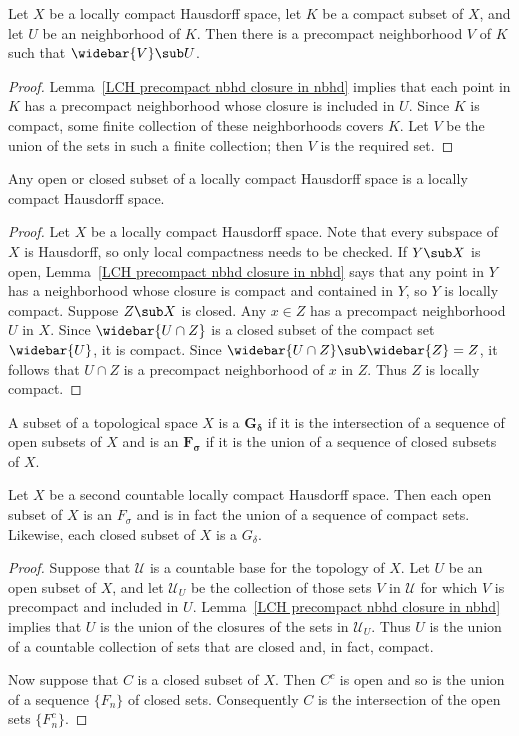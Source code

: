 \begin{proposition}\label{LCH precompact nbhd for compact set}
Let $X$ be a locally compact Hausdorff space, let $K$ be a compact subset of $X$, and let $U$ be an neighborhood of $K$. Then there is a precompact neighborhood $V$ of $K$ such that $\widebar{V}\sub U$.
\end{proposition}
\begin{proof}
Lemma~\ref{LCH precompact nbhd closure in nbhd} implies that each point in $K$ has a precompact neighborhood whose closure is included in $U$. Since $K$ is compact, some finite collection of these neighborhoods covers $K$. Let $V$ be the union of the sets in such a finite collection; then $V$ is the required set.
\end{proof}
\begin{proposition}
Any open or closed subset of a locally compact Hausdorff space is a locally compact Hausdorff space.
\end{proposition}
\begin{proof}
Let $X$ be a locally compact Hausdorff space. Note that every subspace of $X$ is Hausdorff, so only local compactness needs to be checked. If $Y\sub X$ is open, Lemma~\ref{LCH precompact nbhd closure in nbhd} says that any point in $Y$ has a neighborhood whose closure is compact and contained in $Y$, so $Y$ is locally compact. Suppose $Z\sub X$ is closed. Any $x\in Z$ has a precompact neighborhood $U$ in $X$. Since $\widebar{U\cap Z}$ is a closed subset of the compact set $\widebar{U}$, it is compact. Since $\widebar{U\cap Z}\sub\widebar{Z}=Z$, it follows that $U\cap Z$ is a precompact neighborhood of $x$ in $Z$. Thus $Z$ is locally compact.
\end{proof}
A subset of a topological space $X$ is a $\bm{G_{\delta}}$ if it is the intersection of a sequence of open subsets of $X$ and is an $\bm{F_{\sigma}}$ if it is the union of a sequence of closed subsets of $X$.
\begin{proposition}\label{LCH second countable space G_delta}
Let $X$ be a second countable locally compact Hausdorff space. Then each open subset of $X$ is an $F_\sigma$ and is in fact the union of a sequence of compact sets. Likewise, each closed subset of $X$ is a $G_\delta$.
\end{proposition}
\begin{proof}
Suppose that $\mathcal{U}$ is a countable base for the topology of $X$. Let $U$ be an open subset of $X$, and let $\mathcal{U}_U$ be the collection of those sets $V$ in $\mathcal{U}$ for which $V$ is precompact and included in $U$. Lemma~\ref{LCH precompact nbhd closure in nbhd} implies that $U$ is the union of the closures of the sets in $\mathcal{U}_U$. Thus $U$ is the union of a countable collection of sets that are closed and, in fact, compact.\par
Now suppose that $C$ is a closed subset of $X$. Then $C^c$ is open and so is the union of a sequence $\{F_n\}$ of closed sets. Consequently $C$ is the intersection of the open sets $\{F_n^c\}$.
\end{proof}
